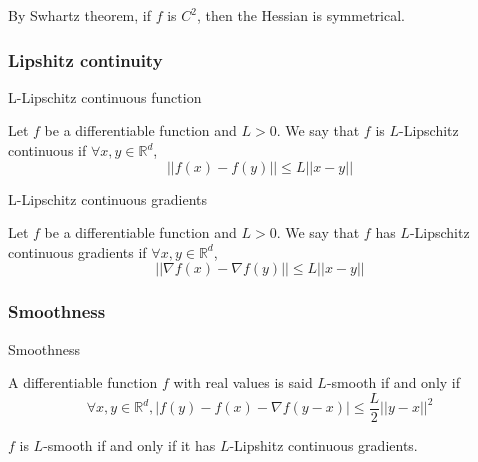 \documentclass[
10pt, %
a4paper, %
oneside, %
headinclude,footinclude, %
BCOR5mm, %
]{scrartcl}
\begin{document}
\begin{remark}
    By Swhartz theorem, if $f$ is $C^2$, then the Hessian is symmetrical.
\end{remark}




\subsubsection{\large\color{Periwinkle}Lipshitz continuity}
\label{def:lipshitz}

\begin{definition}{L-Lipschitz continuous function}

    Let $f$ be a differentiable function and $L>0$. We say that $f$ is $L$-Lipschitz continuous if $\forall x,y\in \mathbb{R}^d$, 
    \begin{equation*}
	||f(x)-f(y)||\leq L||x-y||
    \end{equation*}
\end{definition}

\begin{definition}{L-Lipschitz continuous gradients}

    Let $f$ be a differentiable function and $L>0$. We say that $f$ has $L$-Lipschitz continuous gradients if $\forall x,y\in \mathbb{R}^d$, 
    \begin{equation*}
	||\nabla f(x)-\nabla f(y)||\leq L||x-y||
    \end{equation*}
\end{definition}


\subsubsection{\large\color{Periwinkle}Smoothness}

\begin{definition}{Smoothness}
    \label{def:smoothness}

    A differentiable function $f$ with real values is said $L$-smooth if and only if
    \begin{equation*}
	\forall x, y\in \mathbb{R}^d, |f(y)-f(x)-\nabla f(y-x)|\leq \frac{L}{2} ||y-x||^2
    \end{equation*}
\end{definition}

\begin{lemma}
    $f$ is $L$-smooth if and only if it has $L$-Lipshitz continuous gradients.
\end{lemma}
\end{document}
